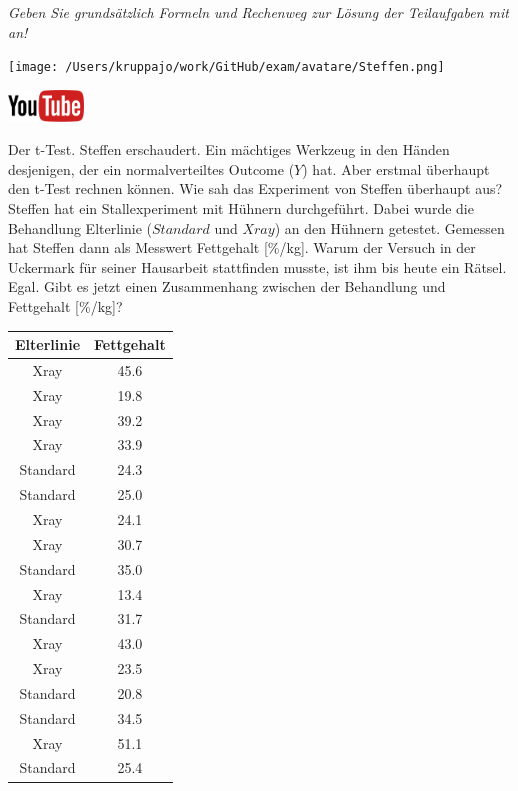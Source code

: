 \documentclass[a4paper, 9pt]{scrartcl}\usepackage[]{graphicx}\usepackage[]{xcolor}
\begin{document}
\textit{Geben Sie grundsätzlich Formeln und Rechenweg zur Lösung der Teilaufgaben mit an!} \\[1Ex]
 

 
\begin{minipage}[t]{0.5\textwidth}
\texttt{[image: /Users/kruppajo/work/GitHub/exam/avatare/Steffen.png]}
\end{minipage}
\begin{minipage}[t]{0.5\textwidth}
\hfill
\href{https://youtu.be/Cq_rF_z4xOk}{\includegraphics[width = 2cm]{img/youtube}}\\[1Ex]
\end{minipage}
\vspace{1ex}



Der t-Test. Steffen erschaudert. Ein mächtiges Werkzeug in den Händen desjenigen, der ein normalverteiltes Outcome ($Y$) hat. Aber erstmal überhaupt den t-Test rechnen können. Wie sah das Experiment von Steffen überhaupt aus? Steffen hat ein Stallexperiment mit Hühnern durchgeführt. Dabei wurde die Behandlung Elterlinie ($Standard$ und $Xray$) an den Hühnern getestet. Gemessen hat Steffen dann als Messwert Fettgehalt [\%/kg]. Warum der Versuch in der Uckermark für seiner Hausarbeit stattfinden musste, ist ihm bis heute ein Rätsel. Egal. Gibt es jetzt einen Zusammenhang zwischen der Behandlung und Fettgehalt [\%/kg]?

\begin{table}[!h]
\centering
\begin{tabular}{cc}
\toprule
Elterlinie & Fettgehalt\\
\midrule
Xray & 45.6\\
Xray & 19.8\\
Xray & 39.2\\
Xray & 33.9\\
Standard & 24.3\\
\addlinespace
Standard & 25.0\\
Xray & 24.1\\
Xray & 30.7\\
Standard & 35.0\\
Xray & 13.4\\
\addlinespace
Standard & 31.7\\
Xray & 43.0\\
Xray & 23.5\\
Standard & 20.8\\
Standard & 34.5\\
\addlinespace
Xray & 51.1\\
Standard & 25.4\\
\bottomrule
\end{tabular}
\end{table}
\end{document}
